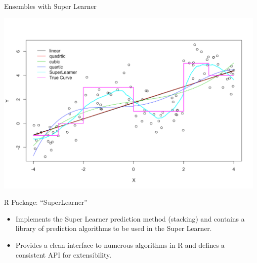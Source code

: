 \documentclass[12pt,t]{beamer}
\begin{document}
\begin{frame}[c]{Ensembles with Super Learner}

\vspace*{3mm}

\centering

\includegraphics[scale=0.55]{optimalSL.png}

\note{
}
\end{frame}


\begin{frame}[c]{R Package: ``SuperLearner''}

\vspace*{3mm}

\centering

  \begin{itemize}
    \itemsep12pt
    \item Implements the Super Learner prediction method (stacking) and
          contains a library of prediction algorithms to be used in the Super
          Learner.
    \item Provides a clean interface to numerous algorithms in R and defines a
          consistent API for extensibility.
  \end{itemize}

\note{
}
\end{frame}
\end{document}
